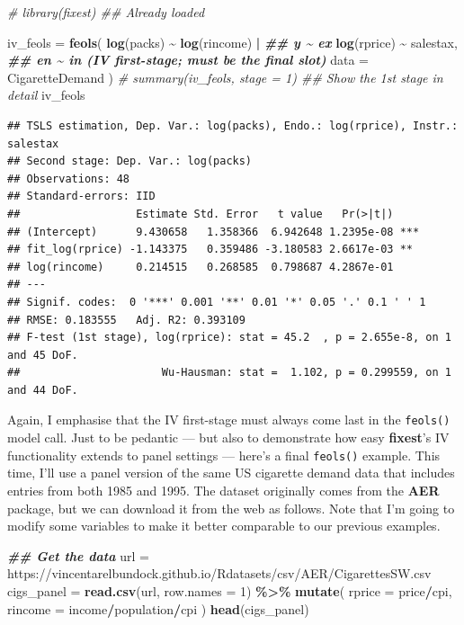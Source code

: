\documentclass[
]{article}
\newenvironment{Shaded}{\begin{snugshade}}{\end{snugshade}}
\newcommand{\AttributeTok}[1]{\textcolor[rgb]{0.13,0.29,0.53}{#1}}
\newcommand{\CommentTok}[1]{\textcolor[rgb]{0.56,0.35,0.01}{\textit{#1}}}
\newcommand{\DecValTok}[1]{\textcolor[rgb]{0.00,0.00,0.81}{#1}}
\newcommand{\DocumentationTok}[1]{\textcolor[rgb]{0.56,0.35,0.01}{\textbf{\textit{#1}}}}
\newcommand{\FunctionTok}[1]{\textcolor[rgb]{0.13,0.29,0.53}{\textbf{#1}}}
\newcommand{\NormalTok}[1]{#1}
\newcommand{\OtherTok}[1]{\textcolor[rgb]{0.56,0.35,0.01}{#1}}
\newcommand{\SpecialCharTok}[1]{\textcolor[rgb]{0.81,0.36,0.00}{\textbf{#1}}}
\newcommand{\StringTok}[1]{\textcolor[rgb]{0.31,0.60,0.02}{#1}}
\begin{document}
\begin{Shaded}
\begin{Highlighting}[]
\CommentTok{\# library(fixest) \#\# Already loaded}

\NormalTok{iv\_feols }\OtherTok{=} 
  \FunctionTok{feols}\NormalTok{(}
    \FunctionTok{log}\NormalTok{(packs) }\SpecialCharTok{\textasciitilde{}} \FunctionTok{log}\NormalTok{(rincome) }\SpecialCharTok{|} \DocumentationTok{\#\# y \textasciitilde{} ex}
      \FunctionTok{log}\NormalTok{(rprice) }\SpecialCharTok{\textasciitilde{}}\NormalTok{ salestax,   }\DocumentationTok{\#\# en \textasciitilde{} in (IV first{-}stage; must be the final slot)}
    \AttributeTok{data =}\NormalTok{ CigaretteDemand}
\NormalTok{    )}
\CommentTok{\# summary(iv\_feols, stage = 1) \#\# Show the 1st stage in detail}
\NormalTok{iv\_feols}
\end{Highlighting}
\end{Shaded}

\begin{verbatim}
## TSLS estimation, Dep. Var.: log(packs), Endo.: log(rprice), Instr.: salestax
## Second stage: Dep. Var.: log(packs)
## Observations: 48 
## Standard-errors: IID 
##                  Estimate Std. Error   t value   Pr(>|t|)    
## (Intercept)      9.430658   1.358366  6.942648 1.2395e-08 ***
## fit_log(rprice) -1.143375   0.359486 -3.180583 2.6617e-03 ** 
## log(rincome)     0.214515   0.268585  0.798687 4.2867e-01    
## ---
## Signif. codes:  0 '***' 0.001 '**' 0.01 '*' 0.05 '.' 0.1 ' ' 1
## RMSE: 0.183555   Adj. R2: 0.393109
## F-test (1st stage), log(rprice): stat = 45.2  , p = 2.655e-8, on 1 and 45 DoF.
##                      Wu-Hausman: stat =  1.102, p = 0.299559, on 1 and 44 DoF.
\end{verbatim}

Again, I emphasise that the IV first-stage must always come last in the
\texttt{feols()} model call. Just to be pedantic --- but also to
demonstrate how easy \textbf{fixest}'s IV functionality extends to panel
settings --- here's a final \texttt{feols()} example. This time, I'll
use a panel version of the same US cigarette demand data that includes
entries from both 1985 and 1995. The dataset originally comes from the
\textbf{AER} package, but we can download it from the web as follows.
Note that I'm going to modify some variables to make it better
comparable to our previous examples.

\begin{Shaded}
\begin{Highlighting}[]
\DocumentationTok{\#\# Get the data}
\NormalTok{url }\OtherTok{=} \StringTok{\textquotesingle{}https://vincentarelbundock.github.io/Rdatasets/csv/AER/CigarettesSW.csv\textquotesingle{}} 
\NormalTok{cigs\_panel }\OtherTok{=}
  \FunctionTok{read.csv}\NormalTok{(url, }\AttributeTok{row.names =} \DecValTok{1}\NormalTok{) }\SpecialCharTok{\%\textgreater{}\%}
  \FunctionTok{mutate}\NormalTok{(}
    \AttributeTok{rprice =}\NormalTok{ price}\SpecialCharTok{/}\NormalTok{cpi,}
    \AttributeTok{rincome =}\NormalTok{ income}\SpecialCharTok{/}\NormalTok{population}\SpecialCharTok{/}\NormalTok{cpi}
\NormalTok{    )}
\FunctionTok{head}\NormalTok{(cigs\_panel)}
\end{Highlighting}
\end{Shaded}
\end{document}
